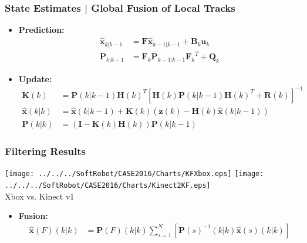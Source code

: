 \begin{frame}
	\frametitle{State Estimates | Global Fusion of Local Tracks}
	\begin{itemize}
		\item \textbf{Prediction:}
		\begin{align}
		\hat{\textbf{x}}_{k|k-1}&=\textbf{F}\hat{\textbf{x}}_{k-1|k-1} + \textbf{B}_k\textbf{u}_k  \nonumber \\ 
		\textbf{P}_{k|k-1}&=\textbf{F}_k\textbf{P}_{k-1|k-1}{\textbf{F}_k}^T + \textbf{Q}_k
		\end{align}
		\item \textbf{Update:}
		\small
		\begin{align} 
		\textbf{K}(k) &=  \textbf{P}(k|k-1){ \textbf{H}(k)}^T{[ \textbf{H}(k) \textbf{P}(k|k-1){ \textbf{H}(k)}^T+ \textbf{R}(k)]}^{-1}
		\nonumber \\ 
		\hat{ \textbf{x}}(k|k) &=\hat{ \textbf{x}}(k|k-1) +  \textbf{K}(k) ( \textbf{z}(k) -  \textbf{H}(k) \hat{ \textbf{x}}(k|k-1)) %
		\nonumber \\ 
		\textbf{P}(k|k)&=( \textbf{I} -  \textbf{K}(k) \textbf{H}(k)) \textbf{P}(k|k-1)
		\end{align}	
	\end{itemize}
\end{frame}

\begin{frame}
	\frametitle{Filtering Results}
		\centering
		\texttt{[image: ../../../SoftRobot/CASE2016/Charts/KFXbox.eps]}
		\texttt{[image: ../../../SoftRobot/CASE2016/Charts/Kinect2KF.eps]} \\
		 Xbox vs. Kinect v1
		\begin{itemize}
			\small \item 	\textbf{Fusion:}
			\begin{align}
			\hat{\textbf{x}}(F)(k|k) &= \textbf{P}(F)(k|k)\sum\limits_{s=1}^{N}\left[{\textbf{P}(s)}^{-1}(k|k)\hat{\textbf{x}}(s)(k|k)\right] \nonumber %
			\end{align}
		\end{itemize}
\end{frame}

